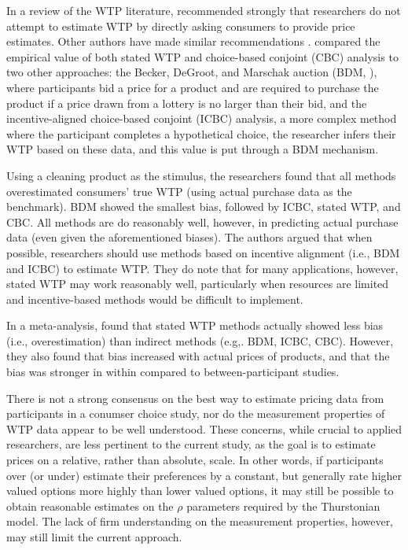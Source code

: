 In a review of the WTP literature, \textcite{breidertREVIEWMETHODSMEASURING2006} recommended strongly that researchers do not attempt to estimate WTP by directly asking consumers to provide price estimates. Other authors have made similar recommendations \textcite{jedidi2009willingness}. \textcite{miller2011should} compared the empirical value of both stated WTP and choice-based conjoint (CBC) analysis to two other approaches: the Becker, DeGroot, and Marschak auction (BDM, \textcite{becker}), where participants bid a price for a product and are required to purchase the product if a price drawn from a lottery is no larger than their bid, and the incentive-aligned choice-based conjoint (ICBC) analysis, a more complex method where the participant completes a hypothetical choice, the researcher infers their WTP based on these data, and this value is put through a BDM mechanism. 

Using a cleaning product as the stimulus, the researchers found that all methods overestimated consumers' true WTP (using actual purchase data as the benchmark). BDM showed the smallest bias, followed by ICBC, stated WTP, and CBC. All methods are do reasonably well, however, in predicting actual purchase data (even given the aforementioned biases). The authors argued that when possible, researchers should use methods based on incentive alignment (i.e., BDM and ICBC) to estimate WTP. They do note that for many applications, however, stated WTP may work reasonably well, particularly when resources are limited and incentive-based methods would be difficult to implement.

In a meta-analysis, \textcite{schmidtAccuratelyMeasuringWillingness2020} found that stated WTP methods actually showed less bias (i.e., overestimation) than indirect methods (e.g,. BDM, ICBC, CBC). However, they also found that bias increased with actual prices of products, and that the bias was stronger in within compared to between-participant studies.

There is not a strong consensus on the best way to estimate pricing data from participants in a conumser choice study, nor do the measurement properties of WTP data appear to be well understood. These concerns, while crucial to applied researchers, are less pertinent to the current study, as the goal is to estimate prices on a relative, rather than absolute, scale. In other words, if participants over (or under) estimate their preferences by a constant, but generally rate higher valued options more highly than lower valued options, it may still be possible to obtain reasonable estimates on the $\rho$ parameters required by the Thurstonian model. The lack of firm understanding on the measurement properties, however, may still limit the current approach.

